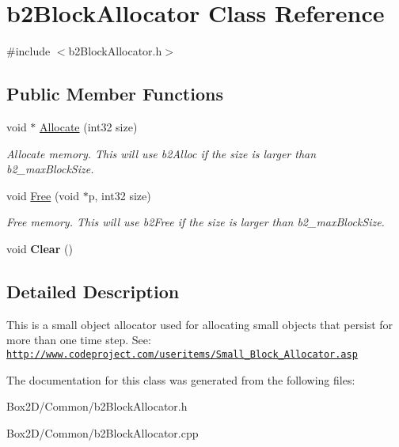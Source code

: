 \hypertarget{classb2_block_allocator}{}\section{b2\+Block\+Allocator Class Reference}
\label{classb2_block_allocator}


{\ttfamily \#include $<$b2\+Block\+Allocator.\+h$>$}

\subsection*{Public Member Functions}
\begin{DoxyCompactItemize}
\item 
\mbox{\label{classb2_block_allocator_a437bf775c23f6e36af11a6d1653d7040}} 
void $\ast$ \hyperlink{classb2_block_allocator_a437bf775c23f6e36af11a6d1653d7040}{Allocate} (int32 size)
\begin{DoxyCompactList}\small\item\em Allocate memory. This will use b2\+Alloc if the size is larger than b2\+\_\+max\+Block\+Size. \end{DoxyCompactList}\item 
\mbox{\label{classb2_block_allocator_a945fdf86e260318b930a53dcc887ca8b}} 
void \hyperlink{classb2_block_allocator_a945fdf86e260318b930a53dcc887ca8b}{Free} (void $\ast$p, int32 size)
\begin{DoxyCompactList}\small\item\em Free memory. This will use b2\+Free if the size is larger than b2\+\_\+max\+Block\+Size. \end{DoxyCompactList}\item 
\mbox{\label{classb2_block_allocator_a3d3bac86217eba9d1eb6dff2acee0d77}} 
void {\bfseries Clear} ()
\end{DoxyCompactItemize}


\subsection{Detailed Description}
This is a small object allocator used for allocating small objects that persist for more than one time step. See\+: \href{http://www.codeproject.com/useritems/Small_Block_Allocator.asp}{\tt http\+://www.\+codeproject.\+com/useritems/\+Small\+\_\+\+Block\+\_\+\+Allocator.\+asp} 

The documentation for this class was generated from the following files\+:\begin{DoxyCompactItemize}
\item 
Box2\+D/\+Common/b2\+Block\+Allocator.\+h\item 
Box2\+D/\+Common/b2\+Block\+Allocator.\+cpp\end{DoxyCompactItemize}
